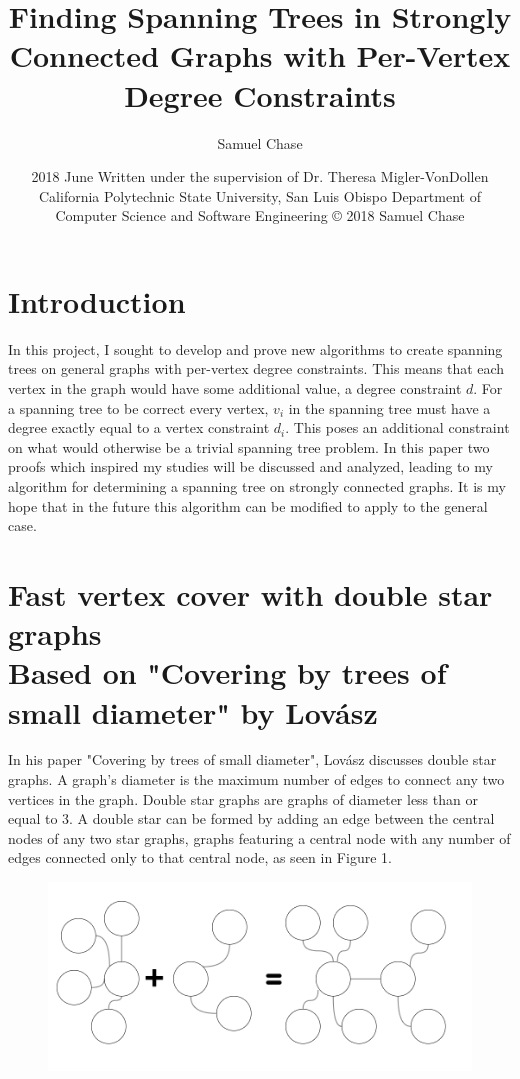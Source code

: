 \documentclass{article}
\title{Finding Spanning Trees in Strongly Connected Graphs with Per-Vertex Degree Constraints}
\author{Samuel Chase}
\date{2018 June \linebreak\linebreak
	\small{Written under the supervision of Dr. Theresa Migler-VonDollen\linebreak\linebreak
	California Polytechnic State University, San Luis Obispo \linebreak\linebreak
	Department of Computer Science and Software Engineering \linebreak\linebreak
	© 2018 Samuel Chase}}
\begin{document}
	\maketitle
	
	\tableofcontents
	\newpage
	\section{Introduction}
	In this project, I sought to develop and prove new algorithms to create spanning trees on general graphs with per-vertex degree constraints. 
	This means that each vertex in the graph would have some additional value, a degree constraint $d$. For a spanning tree to be correct every vertex, $v_{i}$ in the spanning tree must have a degree exactly equal to a vertex constraint $d_{i}$. This poses an additional constraint on what
	would otherwise be a trivial spanning tree problem. In this paper two proofs which inspired my studies will be discussed and analyzed, leading to my algorithm for determining a spanning tree on strongly connected graphs. It is my hope that in the future this algorithm can be modified to apply to the general case.
	
	
	
	\section{Fast vertex cover with double star graphs \\ {\small Based on "Covering by trees of small diameter" by Lov\'asz \cite{1}} }
	In his paper "Covering by trees of small diameter", Lov\'asz discusses double star graphs. A graph's diameter is the maximum number of edges to connect any two vertices in the graph. Double star graphs are graphs of diameter less than or equal to 3. A double star can be formed by adding an edge between the central nodes of any two star graphs, graphs featuring a central node with any number of edges connected only to that central node, as seen in Figure 1.
	\begin{figure}[H]
		\caption{}
		\includegraphics{Figure1}
	\end{figure}
	
\end{document}
